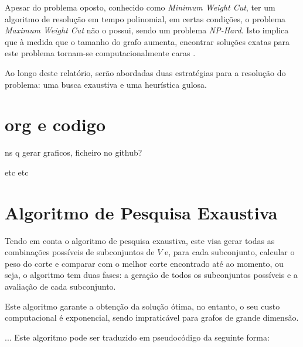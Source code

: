 \documentclass[mirror]{revdetua}
\begin{document}
Apesar do problema oposto, conhecido como \textit{Minimum Weight Cut}, ter um algoritmo de resolução em tempo polinomial, em certas condições, o problema \textit{Maximum Weight Cut} não o possui, sendo um problema \textit{NP-Hard}. Isto implica que à medida que o tamanho do grafo aumenta, encontrar soluções exatas para este problema tornam-se computacionalmente caras \cite{WP24}.

Ao longo deste relatório, serão abordadas duas estratégias para a resolução do problema: uma busca exaustiva e uma heurística gulosa.


\section{org e codigo}

ns q gerar graficos, ficheiro no github?

etc etc

\section{Algoritmo de Pesquisa Exaustiva}

Tendo em conta o algoritmo de pesquisa exaustiva, este visa gerar todas as combinações possíveis de subconjuntos de $V$ e, para cada subconjunto, calcular o peso do corte e comparar com o melhor corte encontrado até ao momento, ou seja, o algoritmo tem duas fases: a geração de todos os subconjuntos possíveis e a avaliação de cada subconjunto.

Este algoritmo garante a obtenção da solução ótima, no entanto, o seu custo computacional é exponencial, sendo impraticável para grafos de grande dimensão.

... Este algoritmo pode ser traduzido em pseudocódigo da seguinte forma:

\begin{comment}
De acordo com o problema, todos os vértices que estão em
S, não estão em T. Assim, o conjunto T é formado pelos
restantes vértices. Dado estes dois subconjuntos, é
possível para cada um deles calcular o peso do corte para
cada possibilidade com a função calculate-weight-cut.

Para fazer as combinações de vértices possíveis, foi utilizado a livraria itertools que contém um método de combinações, gerando automaticamente todas as combinações possíveis para o conjunto S (possible cuts).

É de notar que a função combinations é itertools.combinations(input\_set, r) e a função calculate\_cut\_weight é a função que calcula o peso do corte entre os subconjuntos $S$ e $T$. OU ALGO ASSIM idk
\end{comment}
\end{document}
